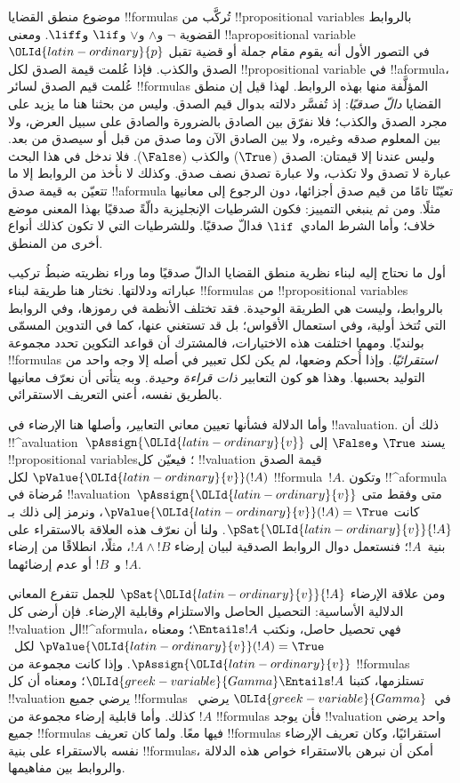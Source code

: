 \documentclass[../../../include/open-logic-section]{subfiles}
\begin{document}


موضوع منطق القضايا !!{formula}s تُركَّب من
!!{propositional variable}s بالروابط القضوية
$\lnot$ و$\land$ و$\lor$ و$\lif$ و$\liff$. ومعنى
!!a{propositional variable}~$\OLId{latin-ordinary}{p}$ في التصور الأول أنه يقوم مقام جملة أو قضية تقبل الصدق والكذب.
فإذا عُلمت قيمة الصدق لكل !!{propositional variable} في
!!a{formula}، عُلمت قيم الصدق لسائر !!{formula}s المؤلَّفة منها بهذه الروابط. لهذا قيل إن منطق القضايا
\emph{دالّ صدقيًا}: إذ تُفسَّر دلالته بدوال قيم الصدق. وليس من بحثنا هنا ما يزيد على مجرد الصدق والكذب؛ فلا نفرّق بين الصادق بالضرورة والصادق على سبيل العرض، ولا بين المعلوم صدقه وغيره، ولا بين الصادق الآن وما صدق من قبل أو سيصدق من بعد. وليس عندنا إلا قيمتان: الصدق
($\True$) والكذب ($\False$). فلا ندخل في هذا البحث عبارة لا تصدق ولا تكذب، ولا عبارة تصدق نصف صدق.
وكذلك لا نأخذ من الروابط إلا ما تتعيّن به قيمة صدق
!!a{formula} تعيّنًا تامًا من قيم صدق أجزائها، دون الرجوع إلى معانيها مثلًا. ومن ثم ينبغي التمييز: فكون الشرطيات الإنجليزية دالّةً صدقيًا بهذا المعنى موضع خلاف؛ وأما الشرط المادي~$\lif$ فدالّ صدقيًا. وللشرطيات التي لا تكون كذلك أنواع أخرى من المنطق.

أول ما نحتاج إليه لبناء نظرية منطق القضايا الدالّ صدقيًا وما وراء نظريته ضبطُ تركيب عباراته ودلالتها. نختار هنا طريقة لبناء
!!{formula}s من !!{propositional variable}s بالروابط، وليست هي الطريقة الوحيدة. فقد تختلف الأنظمة في رموزها، وفي الروابط التي تُتخذ أولية، وفي استعمال الأقواس؛ بل قد تستغني عنها، كما في التدوين المسمّى بولنديًا.
ومهما اختلفت هذه الاختيارات، فالمشترك أن قواعد التكوين تحدد مجموعة
!!{formula}s \emph{استقرائيًا}. وإذا أُحكم وضعها، لم يكن لكل تعبير في أصله إلا وجه واحد من التوليد بحسبها. وهذا هو كون التعابير
\emph{ذات قراءة وحيدة}. وبه يتأتى أن نعرّف معانيها بالطريق نفسه، أعني التعريف الاستقرائي.

وأما الدلالة فشأنها تعيين معاني التعابير، وأصلها هنا الإرضاء في
!!a{valuation}. ذلك أن !!^a{valuation}~$\pAssign{\OLId{latin-ordinary}{v}}$ يسند
$\True$ و$\False$ إلى !!{propositional variable}s؛ فيعيّن كل
!!{valuation} قيمة الصدق $\pValue{\OLId{latin-ordinary}{v}}(!A)$ لكل
!!{formula}~$!A$. وتكون !!^a{formula} مُرضاة في
!!a{valuation}~$\pAssign{\OLId{latin-ordinary}{v}}$ متى وفقط متى كانت
$\pValue{\OLId{latin-ordinary}{v}}(!A) = \True$، ونرمز إلى ذلك بـ
$\pSat{\OLId{latin-ordinary}{v}}{!A}$. ولنا أن نعرّف هذه العلاقة بالاستقراء على بنية~$!A$؛ فنستعمل دوال الروابط الصدقية لبيان إرضاء
$!A \land !B$، مثلًا، انطلاقًا من إرضاء $!A$ و~$!B$ أو عدم إرضائهما.

ومن علاقة الإرضاء $\pSat{\OLId{latin-ordinary}{v}}{!A}$ للجمل تتفرع المعاني الدلالية الأساسية: التحصيل الحاصل والاستلزام وقابلية الإرضاء. فإن أرضى كل
!!{valuation} ال!!^a{formula}، فهي تحصيل حاصل، ونكتب
$\Entails !A$؛ ومعناه $\pValue{\OLId{latin-ordinary}{v}}(!A) = \True$ لكل~$\pAssign{\OLId{latin-ordinary}{v}}$.
وإذا كانت مجموعة من !!{formula}s تستلزمها، كتبنا
$\OLId{greek-variable}{Gamma} \Entails !A$؛ ومعناه أن كل !!{valuation} يرضي جميع
!!{formula}s في~$\OLId{greek-variable}{Gamma}$ يرضي~$!A$ كذلك.
وأما قابلية إرضاء مجموعة من !!{formula}s فأن يوجد
!!{valuation} واحد يرضي جميع !!{formula}s فيها معًا.
ولما كان تعريف !!{formula}s استقرائيًا، وكان تعريف الإرضاء نفسه بالاستقراء على بنية
!!{formula}s، أمكن أن نبرهن بالاستقراء خواص هذه الدلالة والروابط بين مفاهيمها.
\end{document}
